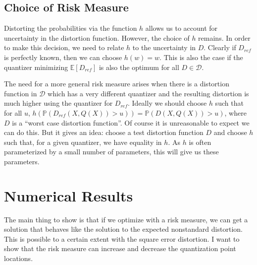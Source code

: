 \documentclass[conference]{IEEEtran}
\begin{document}
\subsection{Choice of Risk Measure}

Distorting the probabilities via the function $h$ allows us to account for uncertainty in the distortion function. However, the choice of $h$ remains. In order to make this decision, we need to relate $h$ to the uncertainty in $D$. Clearly if $D_{ref}$ is perfectly known, then we can choose $h(w) = w$. This is also the case if the quantizer minimizing $\mathbb{E}[D_{ref}]$ is also the optimum for all $D \in \mathcal{D}$. 

The need for a more general risk measure arises when there is a distortion function in $\mathcal{D}$ which has a very different quantizer and the resulting distortion is much higher using the quantizer for $D_{ref}$. Ideally we should choose $h$ such that for all $u$, $h(\mathbb{P}(D_{ref}(X,Q(X)) > u)) = \mathbb{P}(D(X,Q(X)) > u)$, where $D$ is a ``worst case distortion function''. Of course it is unreasonable to expect we can do this. But it gives an idea: choose a test distortion function $D$ and choose $h$ such that, for a given quantizer, we have equality in $h$. As $h$ is often parameterized by a small number of parameters, this will give us these parameters. 


\section{Numerical Results}

The main thing to show is that if we optimize with a risk measure, we can get a solution that behaves like the solution to the expected nonstandard distortion. This is possible to a certain extent with the square error distortion. I want to show that the risk measure can increase and decrease the quantization point locations.  
\end{document}
